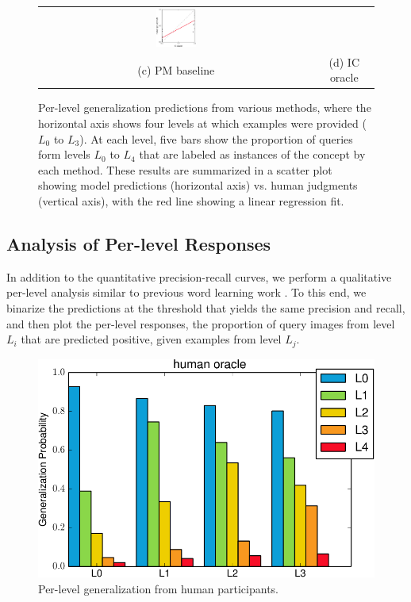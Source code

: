 \begin{figure}[t]
\begin{tabular}{cc}
        \includegraphics[width=0.15\textwidth]{figs/vcl/correlation_ic.pdf}\\
        (c) PM baseline & (d) IC oracle \\
    \end{tabular}
\caption{Per-level generalization predictions from various methods, where the horizontal axis shows four levels at which examples were provided ($L_0$ to $L_3$). At each level, five bars show the proportion of queries form levels $L_0$ to $L_4$ that are labeled as instances of the concept by each method. These results are summarized in a scatter plot showing model predictions (horizontal axis) vs. human judgments (vertical axis), with the red line showing a linear regression fit.}\label{fig:bars}
\end{figure}

\subsection{Analysis of Per-level Responses}\label{subsec:bars}

In addition to the quantitative precision-recall curves, we perform a qualitative per-level analysis similar to previous word learning work \cite{abbott2012}. To this end, we binarize the predictions at the threshold that yields the same precision and recall, and then plot the per-level responses, \ie the proportion of query images from level $L_i$ that are predicted positive, given examples from level $L_j$.

\begin{figure}
    \centering
    \includegraphics[width=0.9\linewidth]{figs/vcl/per_level_response_human.pdf}
    \caption{Per-level generalization from human participants.}\label{fig:humanbars}
\end{figure}

